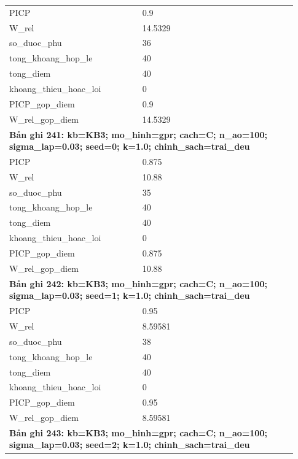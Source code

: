 \begin{longtable}{p{0.43\linewidth}p{0.50\linewidth}}
PICP & 0.9 \\
W\_\allowbreak rel & 14.5329 \\
so\_\allowbreak duoc\_\allowbreak phu & 36 \\
tong\_\allowbreak khoang\_\allowbreak hop\_\allowbreak le & 40 \\
tong\_\allowbreak diem & 40 \\
khoang\_\allowbreak thieu\_\allowbreak hoac\_\allowbreak loi & 0 \\
PICP\_\allowbreak gop\_\allowbreak diem & 0.9 \\
W\_\allowbreak rel\_\allowbreak gop\_\allowbreak diem & 14.5329 \\
\midrule
\multicolumn{2}{p{0.95\linewidth}}{\textbf{Bản ghi 241: kb=KB3; mo\_hinh=gpr; cach=C; n\_ao=100; sigma\_lap=0.03; seed=0; k=1.0; chinh\_sach=trai\_deu}} \\
PICP & 0.875 \\
W\_\allowbreak rel & 10.88 \\
so\_\allowbreak duoc\_\allowbreak phu & 35 \\
tong\_\allowbreak khoang\_\allowbreak hop\_\allowbreak le & 40 \\
tong\_\allowbreak diem & 40 \\
khoang\_\allowbreak thieu\_\allowbreak hoac\_\allowbreak loi & 0 \\
PICP\_\allowbreak gop\_\allowbreak diem & 0.875 \\
W\_\allowbreak rel\_\allowbreak gop\_\allowbreak diem & 10.88 \\
\midrule
\multicolumn{2}{p{0.95\linewidth}}{\textbf{Bản ghi 242: kb=KB3; mo\_hinh=gpr; cach=C; n\_ao=100; sigma\_lap=0.03; seed=1; k=1.0; chinh\_sach=trai\_deu}} \\
PICP & 0.95 \\
W\_\allowbreak rel & 8.59581 \\
so\_\allowbreak duoc\_\allowbreak phu & 38 \\
tong\_\allowbreak khoang\_\allowbreak hop\_\allowbreak le & 40 \\
tong\_\allowbreak diem & 40 \\
khoang\_\allowbreak thieu\_\allowbreak hoac\_\allowbreak loi & 0 \\
PICP\_\allowbreak gop\_\allowbreak diem & 0.95 \\
W\_\allowbreak rel\_\allowbreak gop\_\allowbreak diem & 8.59581 \\
\midrule
\multicolumn{2}{p{0.95\linewidth}}{\textbf{Bản ghi 243: kb=KB3; mo\_hinh=gpr; cach=C; n\_ao=100; sigma\_lap=0.03; seed=2; k=1.0; chinh\_sach=trai\_deu}} \\

\end{longtable}
